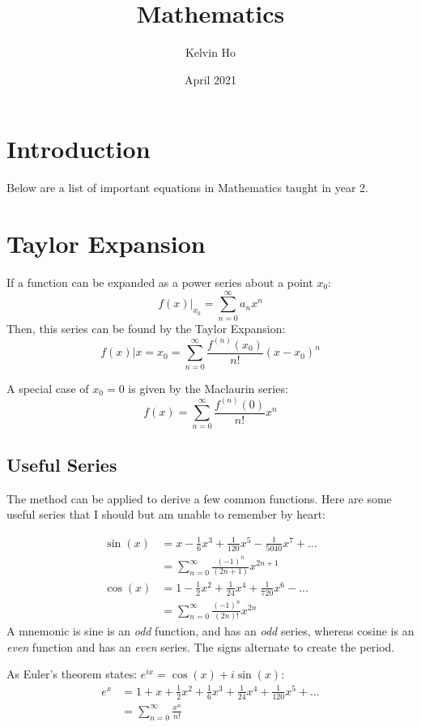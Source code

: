 \documentclass[12pt]{article}
\title{Mathematics}
\author{Kelvin Ho}
\date{April 2021}
\begin{document}
\maketitle

\section{Introduction}
Below are a list of important equations in Mathematics taught in year 2.




\section{Taylor Expansion}
If a function can be expanded as a power series about a point $x_0$:
\[ f(x)|_{x_0} = \sum_{n=0}^\infty a_n x^n\]
Then, this series can be found by the Taylor Expansion:
\[f(x)|{x=x_0} = \sum_{n=0}^\infty \frac{f^{(n)}(x_0)}{n!}(x-x_0)^n\]

A special case of $x_0=0$ is given by the Maclaurin series:
\[ f(x) = \sum_{n=0}^\infty \frac{f^{(n)}(0)}{n!}x^n\]
\subsection{Useful Series}
The method can be applied to derive a few common functions. Here are some useful series that I should but am unable to remember by heart:

\begin{align*}
    \sin(x) &= x - \frac16 x^3 + \frac{1}{120}x^5 -\frac{1}{5040}x^7 +...\\
    &= \sum_{n=0}^\infty \frac{(-1)^n}{(2n+1)}x^{2n+1}\\
    \cos(x) &= 1 - \frac12 x^2 + \frac{1}{24}x^4 + \frac{1}{720}x^6-...\\
    &= \sum_{n=0}^\infty \frac{(-1)^n}{(2n)!}x^{2n}
\end{align*}
A mnemonic is sine is an \textit{odd} function, and has an \textit{odd} series, whereas cosine is an \textit{even} function and has an \textit{even} series. The signs alternate to create the period. 

As Euler's theorem states: $e^{ix} = \cos(x) + i\sin(x)$:
\begin{align*}
    e^x &= 1 + x + \frac12 x^2 + \frac16x^3 + \frac{1}{24}x^4 + \frac{1}{120}x^5 +...\\
    &= \sum_{n=0}^\infty \frac{x^n}{n!}
\end{align*}
\end{document}
